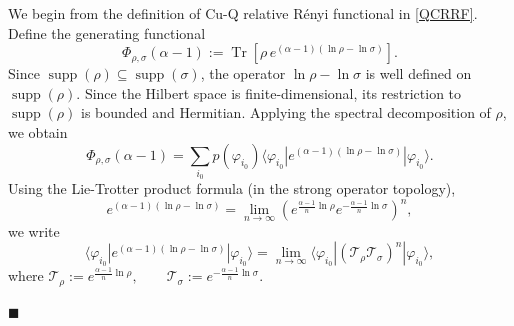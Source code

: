 \documentclass[a4paper, amsfonts, amssymb, amsmath, reprint, showkeys, nofootinbib, twoside, aps, pra]{revtex4-2}
\theoremstyle{definition}
\renewenvironment{proof}{\noindent{\bfseries Proof.}}{\hfill$\blacksquare$}
\begin{document}
\noindent 
\begin{proof}
We begin from the definition of Cu-Q relative Rényi functional in \eqref{QCRRF}. 
Define the generating functional
\begin{equation}\label{Geneq}
\Phi_{\rho,\sigma}(\alpha-1):=\operatorname{Tr}\!\left[ \rho\,e^{(\alpha-1)(\ln\rho-\ln\sigma)}\right].
\end{equation}
Since $\operatorname{supp}(\rho)\subseteq
\operatorname{supp}(\sigma)$, the operator
$\ln\rho-\ln\sigma$ is well defined on
$\operatorname{supp}(\rho)$. Since the Hilbert space is finite-dimensional, its restriction to
$\operatorname{supp}(\rho)$ is bounded and Hermitian. Applying the spectral decomposition of $\rho$, we obtain
\begin{equation}
\Phi_{\rho,\sigma}(\alpha-1)=\sum_{i_0} p(\varphi_{i_0}) \langle\varphi_{i_0}| e^{(\alpha-1)(\ln\rho-\ln\sigma)}
|\varphi_{i_0}\rangle.
\end{equation}
Using the Lie-Trotter product formula (in the strong operator topology),
\begin{equation}
e^{(\alpha-1)(\ln\rho-\ln\sigma)}=\lim_{n\to\infty}\left(
e^{\frac{\alpha-1}{n}\ln\rho}e^{-\frac{\alpha-1}{n}\ln\sigma} \right)^n,
\end{equation}
we write
\begin{equation}
\langle\varphi_{i_0}|e^{(\alpha-1)(\ln\rho-\ln\sigma)} |\varphi_{i_0}\rangle =\lim_{n\to\infty}\langle\varphi_{i_0}|
(\mathcal{T}_\rho \mathcal{T}_\sigma)^n|\varphi_{i_0}\rangle,
\end{equation}
where $\mathcal{T}_\rho := e^{\frac{\alpha-1}{n}\ln\rho},
\qquad\mathcal{T}_\sigma := e^{-\frac{\alpha-1}{n}\ln\sigma}$.


\end{proof}
\end{document}
